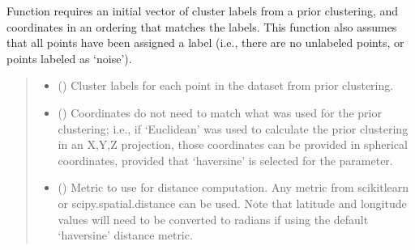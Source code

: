 \documentclass[letterpaper,10pt,english]{sphinxmanual}
\begin{document}
\begin{fulllineitems}
\sphinxAtStartPar
Function requires an initial vector of cluster labels from a prior
clustering, and coordinates in an ordering that matches the labels. This
function also assumes that all points have been assigned a label (i.e.,
there are no unlabeled points, or points labeled as ‘noise’).
\begin{quote}\begin{description}
\begin{itemize}
\item {} 
\sphinxAtStartPar
{} (\sphinxstyleliteralemphasis{\sphinxupquote{, }}\sphinxstyleliteralemphasis{\sphinxupquote{ (}}\sphinxstyleliteralemphasis{\sphinxupquote{,}}\sphinxstyleliteralemphasis{\sphinxupquote{)}}) \textendash{} Cluster labels for each point in the dataset from prior clustering.

\item {} 
\sphinxAtStartPar
{} (\sphinxstyleliteralemphasis{\sphinxupquote{ (}}\sphinxstyleliteralemphasis{\sphinxupquote{, }}\sphinxstyleliteralemphasis{\sphinxupquote{)}}) \textendash{} Coordinates do not need to match what was used for the prior
clustering; i.e., if ‘Euclidean’ was used to calculate the prior
clustering in an X,Y,Z projection, those coordinates can be provided in
spherical coordinates, provided that ‘haversine’ is selected for the
 parameter.

\item {} 
\sphinxAtStartPar
{} (\sphinxstyleliteralemphasis{\sphinxupquote{, }}) \textendash{} 
\sphinxAtStartPar
Metric to use for distance computation. Any metric from scikit\sphinxhyphen{}learn or
scipy.spatial.distance can be used. Note that latitude and longitude
values will need to be converted to radians if using the default
‘haversine’ distance metric.


\end{itemize}
\end{description}
\end{quote}
\end{fulllineitems}
\end{document}
